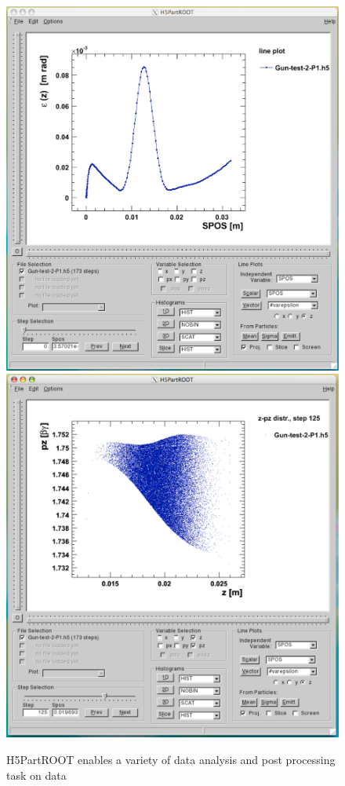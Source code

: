 \begin{figure}[ht]
 \begin{center}
 \includegraphics[width=0.45\linewidth,angle=0]{figures/H5rootPicture1}
  \includegraphics[width=0.45\linewidth,angle=0]{figures/H5rootPicture2}
  \caption{H5PartROOT enables a variety of data analysis and post processing task on \opal data}
  \label{fig:h5root1}
 \end{center}
\end{figure}



